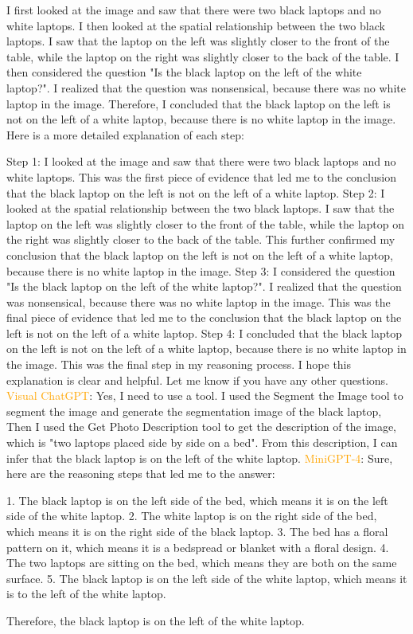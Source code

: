 \begin{enumerate}
        I first looked at the image and saw that there were two black laptops and no white laptops.
        I then looked at the spatial relationship between the two black laptops. I saw that the laptop on the left was slightly closer to the front of the table, while the laptop on the right was slightly closer to the back of the table.
        I then considered the question "Is the black laptop on the left of the white laptop?". I realized that the question was nonsensical, because there was no white laptop in the image.
        Therefore, I concluded that the black laptop on the left is not on the left of a white laptop, because there is no white laptop in the image.
        Here is a more detailed explanation of each step:

        Step 1: I looked at the image and saw that there were two black laptops and no white laptops. This was the first piece of evidence that led me to the conclusion that the black laptop on the left is not on the left of a white laptop.
        Step 2: I looked at the spatial relationship between the two black laptops. I saw that the laptop on the left was slightly closer to the front of the table, while the laptop on the right was slightly closer to the back of the table. This further confirmed my conclusion that the black laptop on the left is not on the left of a white laptop, because there is no white laptop in the image.
        Step 3: I considered the question "Is the black laptop on the left of the white laptop?". I realized that the question was nonsensical, because there was no white laptop in the image. This was the final piece of evidence that led me to the conclusion that the black laptop on the left is not on the left of a white laptop.
        Step 4: I concluded that the black laptop on the left is not on the left of a white laptop, because there is no white laptop in the image. This was the final step in my reasoning process.
        I hope this explanation is clear and helpful. Let me know if you have any other questions.
        \subitem \textcolor{orange}{Visual ChatGPT}: Yes, I need to use a tool. I used the Segment the Image tool to segment the image and generate the segmentation image of the black laptop, Then I used the Get Photo Description tool to get the description of the image, which is "two laptops placed side by side on a bed". From this description, I can infer that the black laptop is on the left of the white laptop.
        \subitem \textcolor{orange}{MiniGPT-4}: Sure, here are the reasoning steps that led me to the answer:

        1. The black laptop is on the left side of the bed, which means it is on the left side of the white laptop.
        2. The white laptop is on the right side of the bed, which means it is on the right side of the black laptop.
        3. The bed has a floral pattern on it, which means it is a bedspread or blanket with a floral design.
        4. The two laptops are sitting on the bed, which means they are both on the same surface.
        5. The black laptop is on the left side of the white laptop, which means it is to the left of the white laptop.
        
        Therefore, the black laptop is on the left of the white laptop.
    \end{enumerate}
